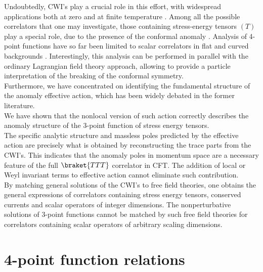 \documentclass[a4paper,11pt,openright,twoside]{book}
\numberwithin{equation}{section}
\begin{document}
{{Undoubtedly, CWI's play a crucial role in this effort, with widespread applications both at zero and at finite temperature \cite{Ohya:2018qkr}.
Among all the possible correlators that one may investigate, those containing stress-energy tensors $(T)$  play a special role, due to the presence of the conformal anomaly \cite{Coriano:2012wp}. Analysis of 4-point functions have so far been limited to scalar correlators in flat \cite{Maglio:2019grh} \cite{Bzowski:2019kwd} and curved backgrounds \cite{Arkani-Hamed:2018kmz,Baumann:2019oyu}.
Interestingly, this analysis can be performed in parallel with the ordinary Lagrangian field theory approach, allowing to provide a particle interpretation of the breaking of the conformal symmetry. \\
Furthermore, we have concentrated on identifying the fundamental structure of the anomaly effective action, which has been widely debated in the former literature.\\
We have shown that the nonlocal version of such action correctly describes the anomaly structure of the 3-point function of stress energy tensors. \\
The specific analytic structure and massless poles predicted by the effective action are precisely what is obtained by reconstructing the trace parts from the CWI's. This indicates that the anomaly poles in momentum space are a necessary feature of the full $\braket{TTT}$ correlator in CFT. 
The addition of local or Weyl invariant terms to effective action cannot eliminate such contribution. \\
By matching general solutions of the CWI's to free field theories, one obtains the general expressions of correlators containing stress energy tensors, conserved currents and scalar operators of integer dimensions. The nonperturbative solutions of 3-point functions cannot be matched by such free field theories for correlators containing scalar operators of arbitrary scaling dimensions.

%
\appendix
{}
\chapter{4-point function relations}
}}
\end{document}
